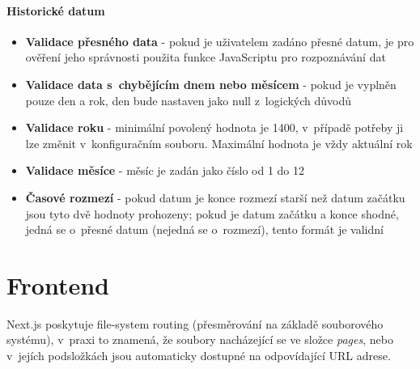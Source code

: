 \documentclass[12pt, a4paper,
  oneside,      %
]{report}
\begin{document}
\subsubsection{Historické datum}
\begin{itemize}
	\item \textbf{Validace přesného data} - pokud je uživatelem zadáno přesné datum, je pro ověření jeho správnosti použita funkce JavaScriptu pro rozpoznávání dat
	\item \textbf{Validace data s~chybějícím dnem nebo měsícem} - pokud je vyplněn pouze den a rok, den bude nastaven jako null z~logických důvodů
	\item \textbf{Validace roku} - minimální povolený hodnota je 1400, v~případě potřeby ji lze změnit v~konfiguračním souboru. Maximální hodnota je vždy aktuální rok
	\item \textbf{Validace měsíce} - měsíc je zadán jako číslo od 1 do 12
	\item \textbf{Časové rozmezí} - pokud datum je konce rozmezí starší než datum začátku jsou tyto dvě hodnoty prohozeny; pokud je datum začátku a konce shodné, jedná se o~přesné datum (nejedná se o~rozmezí), tento formát je validní
\end{itemize}


\chapter{Frontend}\label{subsection:fileSystemRouting}
Next.js poskytuje file-system routing (přesměrování na základě souborového systému), v~praxi to znamená, že soubory nacházející se ve složce \textit{pages}, nebo v~jejích podsložkách jsou automaticky dostupné na odpovídající URL adrese.
\end{document}
